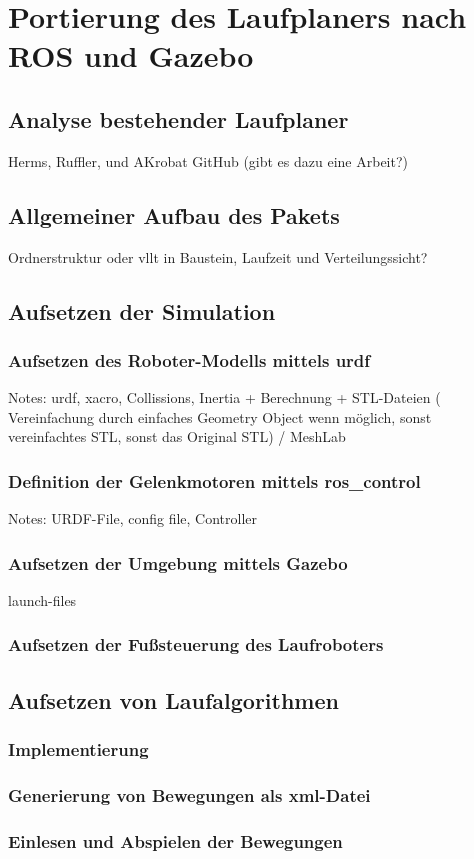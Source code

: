 \chapter{Portierung des Laufplaners nach ROS und Gazebo}

\section{Analyse bestehender Laufplaner}

Herms, Ruffler, und AKrobat GitHub (gibt es dazu eine Arbeit?)

\section{Allgemeiner Aufbau des Pakets}

Ordnerstruktur oder vllt in Baustein, Laufzeit und Verteilungssicht?

\section{Aufsetzen der Simulation}

\subsection{Aufsetzen des Roboter-Modells mittels urdf}

Notes: urdf, xacro, Collissions, Inertia + Berechnung + STL-Dateien ( Vereinfachung durch einfaches Geometry Object wenn möglich, sonst vereinfachtes STL, sonst das Original STL) / MeshLab

\subsection{Definition der Gelenkmotoren mittels ros\_control}

Notes: URDF-File, config file, Controller

\subsection{Aufsetzen der Umgebung mittels Gazebo}

launch-files

\subsection{Aufsetzen der Fußsteuerung des Laufroboters}

\section{Aufsetzen von Laufalgorithmen}

\subsection{Implementierung}
\subsection{Generierung von Bewegungen als xml-Datei}
\subsection{Einlesen und Abspielen der Bewegungen}